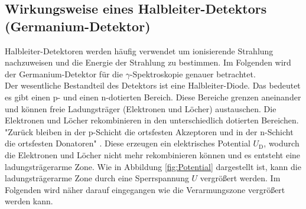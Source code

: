 \newpage
\subsection{Wirkungsweise eines Halbleiter-Detektors (Germanium-Detektor)}
Halbleiter-Detektoren werden häufig verwendet um ionisierende Strahlung nachzuweisen und die Energie der Strahlung zu bestimmen. Im Folgenden wird der Germanium-Detektor für die $\gamma$-Spektroskopie genauer betrachtet. \\
Der wesentliche Bestandteil des Detektors ist eine Halbleiter-Diode. Das bedeutet es gibt einen p- und einen n-dotierten Bereich. Diese Bereiche grenzen aneinander und können freie Ladungsträger (Elektronen und Löcher) austauschen. Die Elektronen und Löcher rekombinieren in den unterschiedlich dotierten Bereichen. "Zurück bleiben in der p-Schicht die ortsfesten Akzeptoren und in der n-Schicht die ortsfesten Donatoren" \cite[10]{V18}. Diese erzeugen ein elektrisches Potential $U_\text{D}$, wodurch die Elektronen und Löcher nicht mehr rekombinieren können und es entsteht eine ladungsträgerarme Zone. Wie in Abbildung \eqref{fig:Potential} dargestellt ist, kann die ladungsträgerarme Zone durch eine Sperrspannung $U$ vergrößert werden. Im Folgenden wird näher darauf eingegangen wie die Verarmungszone vergrößert werden kann.


